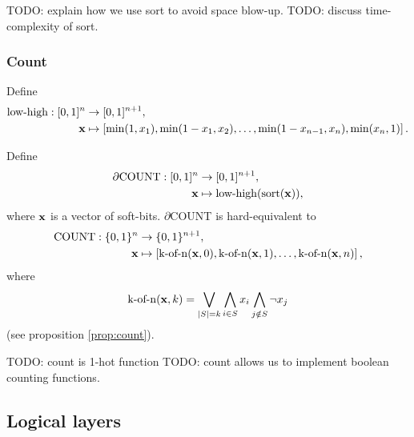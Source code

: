 \documentclass{article} %
\begin{document}
TODO: explain how we use sort to avoid space blow-up.
TODO: discuss time-complexity of sort.

\subsubsection{Count}

Define 
\begin{equation*}
\begin{aligned}
\operatorname{low-high}: [0,1]^{n} &\to [0,1]^{n+1},\\
{\bf x} &\mapsto \left[ \operatorname{min}(1, x_{1}), \operatorname{min}(1 - x_{1}, x_{2}), \dots, \operatorname{min}(1 - x_{n-1}, x_{n}), \operatorname{min}(x_{n}, 1) \right]\text{.}
\end{aligned}
\end{equation*}

Define
\begin{equation*}
\begin{aligned}
\partial\text{COUNT}: [0,1]^{n} &\to [0,1]^{n+1}, \\
{\bf x} &\mapsto \operatorname{low-high}(\operatorname{sort}({\bf x}))\text{,}
\end{aligned}
\end{equation*}
where ${\bf x}$ is a vector of soft-bits. $\partial${COUNT} is hard-equivalent to
\begin{equation*}
\begin{aligned}
\text{COUNT}: \{0,1\}^{n} &\to \{0,1\}^{n+1}, \\
{\bf x} &\mapsto \left[\operatorname{k-of-n}({\bf x}, 0), \operatorname{k-of-n}({\bf x}, 1), \dots, \operatorname{k-of-n}({\bf x}, n)\right]\text{,}
\end{aligned}
\end{equation*}
where
\begin{equation*}
\operatorname{k-of-n}({\bf x}, k) = \bigvee_{|S|=k} \bigwedge_{i\in S} x_i \bigwedge_{j\notin S} \neg x_j
\end{equation*}
(see proposition \ref{prop:count}).


TODO: count is 1-hot function
TODO: count allows us to implement boolean counting functions.

\subsection{Logical layers}
\end{document}
